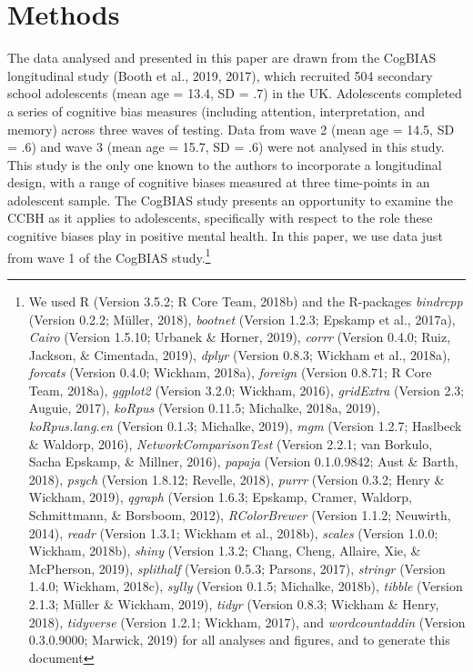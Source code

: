 \documentclass[man,floatsintext]{apa6}
\let\rmarkdownfootnote\footnote%
\def\footnote{\protect\rmarkdownfootnote}
\begin{document}
\hypertarget{methods}{%
\section{Methods}\label{methods}}

The data analysed and presented in this paper are drawn from the CogBIAS longitudinal study (Booth et al., 2019, 2017), which recruited 504 secondary school adolescents (mean age = 13.4, SD = .7) in the UK. Adolescents completed a series of cognitive bias measures (including attention, interpretation, and memory) across three waves of testing. Data from wave 2 (mean age = 14.5, SD = .6) and wave 3 (mean age = 15.7, SD = .6) were not analysed in this study. This study is the only one known to the authors to incorporate a longitudinal design, with a range of cognitive biases measured at three time-points in an adolescent sample. The CogBIAS study presents an opportunity to examine the CCBH as it applies to adolescents, specifically with respect to the role these cognitive biases play in positive mental health. In this paper, we use data just from wave 1 of the CogBIAS study.\footnote{We used R (Version 3.5.2; R Core Team, 2018b) and the R-packages \emph{bindrcpp} (Version 0.2.2; Müller, 2018), \emph{bootnet} (Version 1.2.3; Epskamp et al., 2017a), \emph{Cairo} (Version 1.5.10; Urbanek \& Horner, 2019), \emph{corrr} (Version 0.4.0; Ruiz, Jackson, \& Cimentada, 2019), \emph{dplyr} (Version 0.8.3; Wickham et al., 2018a), \emph{forcats} (Version 0.4.0; Wickham, 2018a), \emph{foreign} (Version 0.8.71; R Core Team, 2018a), \emph{ggplot2} (Version 3.2.0; Wickham, 2016), \emph{gridExtra} (Version 2.3; Auguie, 2017), \emph{koRpus} (Version 0.11.5; Michalke, 2018a, 2019), \emph{koRpus.lang.en} (Version 0.1.3; Michalke, 2019), \emph{mgm} (Version 1.2.7; Haslbeck \& Waldorp, 2016), \emph{NetworkComparisonTest} (Version 2.2.1; van Borkulo, Sacha Epskamp, \& Millner, 2016), \emph{papaja} (Version 0.1.0.9842; Aust \& Barth, 2018), \emph{psych} (Version 1.8.12; Revelle, 2018), \emph{purrr} (Version 0.3.2; Henry \& Wickham, 2019), \emph{qgraph} (Version 1.6.3; Epskamp, Cramer, Waldorp, Schmittmann, \& Borsboom, 2012), \emph{RColorBrewer} (Version 1.1.2; Neuwirth, 2014), \emph{readr} (Version 1.3.1; Wickham et al., 2018b), \emph{scales} (Version 1.0.0; Wickham, 2018b), \emph{shiny} (Version 1.3.2; Chang, Cheng, Allaire, Xie, \& McPherson, 2019), \emph{splithalf} (Version 0.5.3; Parsons, 2017), \emph{stringr} (Version 1.4.0; Wickham, 2018c), \emph{sylly} (Version 0.1.5; Michalke, 2018b), \emph{tibble} (Version 2.1.3; Müller \& Wickham, 2019), \emph{tidyr} (Version 0.8.3; Wickham \& Henry, 2018), \emph{tidyverse} (Version 1.2.1; Wickham, 2017), and \emph{wordcountaddin} (Version 0.3.0.9000; Marwick, 2019) for all analyses and figures, and to generate this document}
\end{document}

